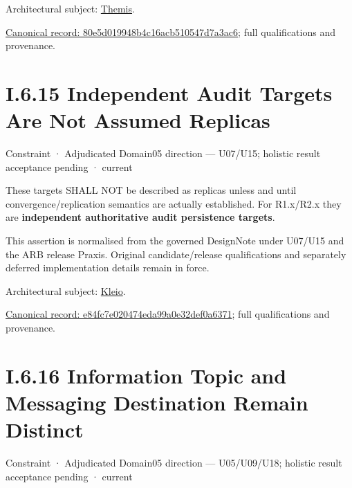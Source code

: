 Architectural subject: \hyperref[element:899d34ec491948b68aad09e507dea6d1]{Themis}.


{\footnotesize \href{../../../../../../../continuum/motivation/constraint/80e5d019948b4c16acb510547d7a3ac6.md}{Canonical record: 80e5d019948b4c16acb510547d7a3ac6}; full qualifications and provenance.}\par
\section*{I.6.15 Independent Audit Targets Are Not Assumed Replicas}
\label{navigation:I.6.15}

\label{element:e84fc7e020474eda99a0e32def0a6371}
{\small Constraint · Adjudicated Domain05 direction — U07/U15; holistic result acceptance pending · current}\par

These targets SHALL NOT be described as replicas unless and until convergence/replication semantics are actually established. For R1.x/R2.x they are \textbf{independent authoritative audit persistence targets}.



This assertion is normalised from the governed DesignNote under U07/U15 and the ARB release Praxis. Original candidate/release qualifications and separately deferred implementation details remain in force.



Architectural subject: \hyperref[element:fefda110e2274884ad58906733606efd]{Kleio}.


{\footnotesize \href{../../../../../../../continuum/motivation/constraint/e84fc7e020474eda99a0e32def0a6371.md}{Canonical record: e84fc7e020474eda99a0e32def0a6371}; full qualifications and provenance.}\par
\section*{I.6.16 Information Topic and Messaging Destination Remain Distinct}
\label{navigation:I.6.16}

\label{element:ba909d70784349cd94b8adb4d6a9ab69}
{\small Constraint · Adjudicated Domain05 direction — U05/U09/U18; holistic result acceptance pending · current}\par

